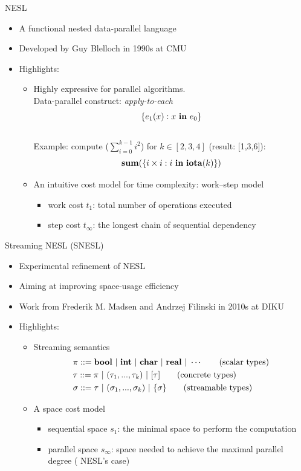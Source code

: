 \documentclass{beamer}
\begin{document}
\begin{frame}{NESL}
	\begin{itemize}
		\item A functional nested data-parallel language
		\item Developed by Guy Blelloch in 1990s at CMU
		\item Highlights: 
		\begin{itemize}
			\item Highly expressive for parallel algorithms. \\ 
			Data-parallel construct: \emph{apply-to-each} $$\{e_1(x) : x \ \mathbf{in} \ e_0 \} $$\\ 
	  Example: compute ($\sum_{i=0}^{k-1} i^2$) for $k \in [2,3,4]$ (result: [1,3,6]):
	  $$\mathbf{sum}(\{i \times i : i \ \mathbf{in} \ \mathbf{iota} (k) \}) $$
	  
	  \item An intuitive cost model for time complexity: work--step model
	  \begin{itemize}
	  	\item work cost $t_1$: total number of operations executed
	  	\item step cost $t_\infty$: the longest chain of sequential dependency
	  \end{itemize}
	\end{itemize}
	\end{itemize}
  
\end{frame}

\begin{frame}{Streaming NESL (SNESL)}
	\begin{itemize}
		\item Experimental refinement of NESL
		\item Aiming at improving space-usage efficiency 
		\item Work from Frederik M. Madsen and Andrzej Filinski in 2010s at DIKU
		\item Highlights:
		\begin{itemize}
			\item Streaming semantics 
			\begin{align*} 
			& \pi ::= \bool \ | \ \int \ | \ \*{char} \ | \ \*{real}  \ | \ \cdots \tag{scalar types}\\
			& \tau ::= \pi \ | \ (\tau_1,...,\tau_k) \ | \ [\tau] \tag{concrete types} \\
			& \sigma ::= \tau \ | \ (\sigma_1,...,\sigma_k) \ | \ \tseq{\sigma}  \tag{streamable types} 
			\end{align*}
			
			\item A space cost model
			\begin{itemize}
				\item sequential space $s_1$: the minimal space to perform the computation
				\item parallel space $s_\infty$: space needed to achieve the maximal parallel degree ( NESL's case)
			\end{itemize}
		\end{itemize}
	\end{itemize}
\end{frame}
\end{document}

